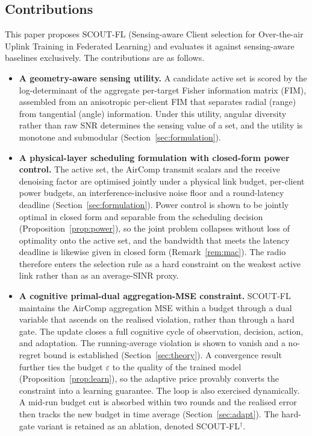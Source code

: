 \documentclass[lettersize,journal]{IEEEtran}
\newcommand{\scout}{SCOUT-FL}
\begin{document}
\subsection{Contributions}
This paper proposes \scout{} (Sensing-aware Client selection for Over-the-air Uplink Training in Federated Learning) and evaluates it against sensing-aware baselines exclusively. The contributions are as follows.
\begin{itemize}
\item \textbf{A geometry-aware sensing utility.} A candidate active set is scored by the log-determinant of the aggregate per-target Fisher information matrix (FIM), assembled from an anisotropic per-client FIM that separates radial (range) from tangential (angle) information. Under this utility, angular diversity rather than raw SNR determines the sensing value of a set, and the utility is monotone and submodular (Section~\ref{sec:formulation}).
\item \textbf{A physical-layer scheduling formulation with closed-form power control.} The active set, the AirComp transmit scalars and the receive denoising factor are optimised jointly under a physical link budget, per-client power budgets, an interference-inclusive noise floor and a round-latency deadline (Section~\ref{sec:formulation}). Power control is shown to be jointly optimal in closed form and separable from the scheduling decision (Proposition~\ref{prop:power}), so the joint problem collapses without loss of optimality onto the active set, and the bandwidth that meets the latency deadline is likewise given in closed form (Remark~\ref{rem:mac}). The radio therefore enters the selection rule as a hard constraint on the weakest active link rather than as an average-SINR proxy.
\item \textbf{A cognitive primal-dual aggregation-MSE constraint.} \scout{} maintains the AirComp aggregation MSE within a budget through a dual variable that ascends on the realised violation, rather than through a hard gate. The update closes a full cognitive cycle of observation, decision, action, and adaptation. The running-average violation is shown to vanish and a no-regret bound is established (Section~\ref{sec:theory}). A convergence result further ties the budget $\varepsilon$ to the quality of the trained model (Proposition~\ref{prop:learn}), so the adaptive price provably converts the constraint into a learning guarantee. The loop is also exercised dynamically. A mid-run budget cut is absorbed within two rounds and the realised error then tracks the new budget in time average (Section~\ref{sec:adapt}). The hard-gate variant is retained as an ablation, denoted \scout{}$^{\dagger}$.

\end{itemize}
\end{document}
